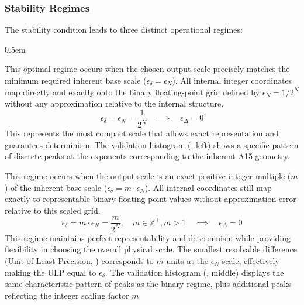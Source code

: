 \documentclass[10pt]{article}
\begin{document}
\subsubsection{Stability Regimes}\label{subsubsec-stability-regimes}
The stability condition leads to three distinct operational regimes:

\begin{description} \itemsep0.5em
    \item[Binary Scaling ($\epsilon_\Delta = 0$ with $m=1$):] This optimal regime occurs when the chosen output scale precisely matches the minimum required inherent base scale ($\epsilon_\delta = \epsilon_N$). All internal integer coordinates map directly and exactly onto the binary floating-point grid defined by $\epsilon_N = 1/2^N$ without any approximation relative to the internal structure.
    \begin{equation}\label{eq-scaling-binary}
    \epsilon_\delta = \epsilon_N = \frac{1}{2^N} \quad \implies \quad \epsilon_\Delta = 0
    \end{equation}
    This represents the most compact scale that allows exact representation and guarantees determinism. The validation histogram (, left) shows a specific pattern of discrete peaks at the exponents corresponding to the inherent A15 geometry.

    \item[Stable Scaling ($\epsilon_\Delta = 0$ with $m > 1$):] This regime occurs when the output scale is an exact positive integer multiple ($m$) of the inherent base scale ($\epsilon_\delta = m \cdot \epsilon_N$). All internal coordinates still map exactly to representable binary floating-point values without approximation error relative to this scaled grid.
    \begin{equation}\label{eq-scaling-stable}
    \epsilon_\delta = m \cdot \epsilon_N = \frac{m}{2^N}, \quad m \in \mathbb{Z}^+, m > 1 \quad \implies \quad \epsilon_\Delta = 0
    \end{equation}
    This regime maintains perfect representability and determinism while providing flexibility in choosing the overall physical scale. The smallest resolvable difference (Unit of Least Precision, ) corresponds to $m$ units at the $\epsilon_N$ scale, effectively making the ULP equal to $\epsilon_\delta$. The validation histogram (, middle) displays the same characteristic pattern of peaks as the binary regime, plus additional peaks reflecting the integer scaling factor $m$.


\end{description}
\end{document}
